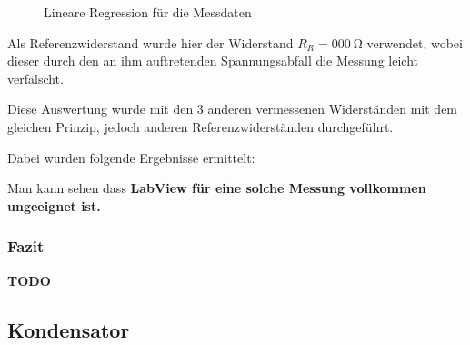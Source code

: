 \documentclass[12pt,twoside,a4paper]{scrartcl}
\begin{document}
				\begin{figure}[H]
					\centering
					\caption{Lineare Regression für die Messdaten}
			\end{figure}

				
				Als Referenzwiderstand wurde hier der Widerstand $R_R = \SI{000}{\ohm}$ verwendet, wobei dieser durch den an ihm auftretenden Spannungsabfall die Messung leicht verfälscht.

				Diese Auswertung wurde mit den 3 anderen vermessenen Widerständen mit dem gleichen Prinzip, jedoch anderen Referenzwiderständen durchgeführt.

				Dabei wurden folgende Ergebnisse ermittelt:

					

				Man kann sehen dass \textbf{LabView für eine solche Messung vollkommen ungeeignet ist.}

			\subsubsection{Fazit}

				\textbf{TODO}

		\subsection{Kondensator}
\end{document}
